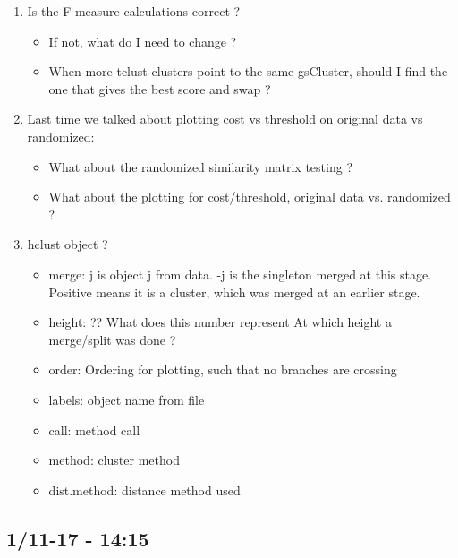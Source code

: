 \documentclass[a4paper,10pt]{article}
\begin{document}
\begin{enumerate}
	\item Is the F-measure calculations correct ?
	\begin{itemize}
		\item If not, what do I need to change ?
		
		\item When more tclust clusters point to the same gsCluster, should I find the one 
		that gives the best score and swap ?
	\end{itemize}
	
	\item Last time we talked about plotting cost vs threshold on original data vs randomized:
	\begin{itemize}
		\item What about the randomized similarity matrix testing ?
		\item What about the plotting for cost/threshold, original data vs. randomized ?
	\end{itemize}
	
	\item hclust object ?
	\begin{itemize}
		\item merge: j is object j from data. -j is the singleton merged at this stage. Positive means it is a cluster, which was merged at an earlier stage.
		
		\item height: ?? What does this number represent
		At which height a merge/split was done ?
		
		\item order: Ordering for plotting, such that no branches are crossing
		
		\item labels: object name from file
		
		\item call: method call
		
		\item method: cluster method
		
		\item dist.method: distance method used
	\end{itemize}
	
\end{enumerate}

\subsection{1/11-17 - 14:15}
\end{document}
